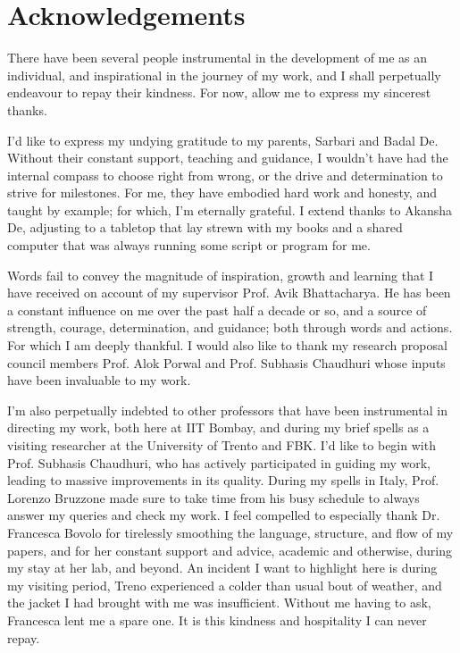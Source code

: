 \chapter*{Acknowledgements}

There have been several people instrumental in the development of me as an individual, and inspirational in the journey of my work, and I shall perpetually endeavour to repay their kindness. For now, allow me to express my sincerest thanks. 

I'd like to express my undying gratitude to my parents, Sarbari and Badal De. Without their constant support, teaching and guidance, I wouldn't have had the internal compass to choose right from wrong, or the drive and determination to strive for milestones. For me, they have embodied hard work and honesty, and taught by example; for which, I'm eternally grateful. I extend thanks to Akansha De, adjusting to a tabletop that lay strewn with my books and a shared computer that was always running some script or program for me. 

Words fail to convey the magnitude of inspiration, growth and learning that I have received on account of my supervisor Prof. Avik Bhattacharya. He has been a constant influence on me over the past half a decade or so, and a source of strength, courage, determination, and guidance; both through words and actions. For which I am deeply thankful. I would also like to thank my research proposal council members Prof. Alok Porwal and Prof. Subhasis Chaudhuri whose inputs have been invaluable to my work.

I'm also perpetually indebted to other professors that have been instrumental in directing my work, both here at IIT Bombay, and during my brief spells as a visiting researcher at the University of Trento and FBK. I'd like to begin with Prof. Subhasis Chaudhuri, who has actively participated in guiding my work, leading to massive improvements in its quality. During my spells in Italy, Prof. Lorenzo Bruzzone made sure to take time from his busy schedule to always answer my queries and check my work. I feel compelled to especially thank Dr. Francesca Bovolo for tirelessly smoothing the language, structure, and flow of my papers, and for her constant support and advice, academic and otherwise, during my stay at her lab, and beyond. An incident I want to highlight here is during my visiting period, Treno experienced a colder than usual bout of weather, and the jacket I had brought with me was insufficient. Without me having to ask, Francesca lent me a spare one. It is this kindness and hospitality I can never repay. 

